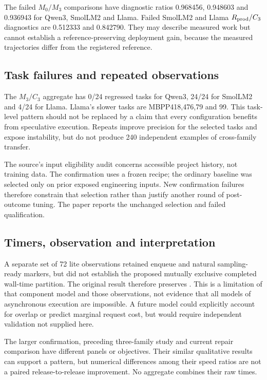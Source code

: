 The failed $M_0/M_3$ comparisons have diagnostic ratios 0.968456, 0.948603 and 0.936943 for Qwen3, SmolLM2 and Llama. Failed SmolLM2 and Llama $R_{\rm prod}/C_3$ diagnostics are 0.512333 and 0.842790. They may describe measured work but cannot establish a reference-preserving deployment gain, because the measured trajectories differ from the registered reference.

\subsection{Task failures and repeated observations}
The $M_3/C_3$ aggregate has 0/24 regressed tasks for Qwen3, 24/24 for SmolLM2 and 4/24 for Llama. Llama's slower tasks are MBPP418,476,79 and 99. This task-level pattern should not be replaced by a claim that every configuration benefits from speculative execution. Repeats improve precision for the selected tasks and expose instability, but do not produce 240 independent examples of cross-family transfer.

The source's input eligibility audit concerns accessible project history, not training data. The confirmation uses a frozen recipe; the ordinary baseline was selected only on prior exposed engineering inputs. New confirmation failures therefore constrain that selection rather than justify another round of post-outcome tuning. The paper reports the unchanged selection and failed qualification.

\subsection{Timers, observation and interpretation}
A separate set of 72 lite observations retained enqueue and natural sampling-ready markers, but did not establish the proposed mutually exclusive completed wall-time partition. The original result therefore preserves . This is a limitation of that component model and those observations, not evidence that all models of asynchronous execution are impossible. A future model could explicitly account for overlap or predict marginal request cost, but would require independent validation not supplied here.

The larger confirmation, preceding three-family study and current repair comparison have different panels or objectives. Their similar qualitative results can support a pattern, but numerical differences among their speed ratios are not a paired release-to-release improvement. No aggregate combines their raw times.
